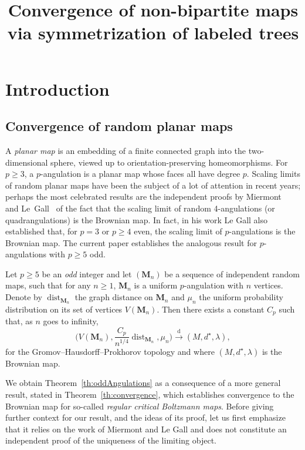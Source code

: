 \documentclass[AHL,Unicode,longabstracts,published]{cedram}
\title[Convergence of non-bipartite maps]{Convergence of non-bipartite maps via symmetrization of labeled trees}
\author[\initial{L.} \lastname{Addario-Berry}]{\firstname{Louigi} \lastname{Addario-Berry}}
\author[\initial{M.} \lastname{Albenque}]{\firstname{Marie} \lastname{Albenque}}
\newcommand{\bM}{\mathbf{M}}
\DeclareMathOperator{\dist}{dist}
\newcommand{\convdist}{\ensuremath{\stackrel{\mathrm{d}}{\rightarrow}}}
\begin{document}
\maketitle


\section{Introduction}\label{sec:introduction}

\subsection{Convergence of random planar maps}
A \emph{planar map} is an embedding of a finite connected graph into the two-dimensional sphere, viewed up to orientation-preserving homeomorphisms. For $p\geq 3$, a \linebreak$p$-angulation is a planar map whose faces all have degree $p$. Scaling limits of random planar maps have been the subject of a lot of attention in recent years; perhaps the most celebrated results are the independent proofs by Miermont~\cite{MiermontBrownian} and Le~Gall~\cite{LeGallUniqueness} of the fact that the scaling limit of random 4-angulations (or quadrangulations) is the Brownian map. In fact, in his work Le Gall also established that, for $p=3$ or $p\ge 4$ even, the scaling limit of $p$-angulations is the Brownian map. The current paper establishes the analogous result for $p$-angulations with $p\ge 5$ odd.

\begin{theo}\label{th:oddAngulations}
Let $p\geq 5$ be an \emph{odd} integer and let $(\bM_n)$ be a sequence of independent random maps, such that for any $n\geq 1$, $\bM_n$ is a uniform $p$-angulation with $n$ vertices. Denote by $\dist_{\bM_n}$ the graph distance on $\bM_n$ and $\mu_n$ the uniform probability distribution on its set of vertices $V(\bM_n)$. Then there exists a constant $C_p$ such that, as $n$ goes to infinity,
\[
\Big(V(\bM_n),\frac{C_p}{n^{1/4}}\dist_{\bM_n},\mu_n\Big) \convdist (M,d^\star,\lambda),
\]
for the Gromov--Hausdorff--Prokhorov topology and where $(M,d^\star,\lambda)$ is the Brownian map.
\end{theo}

We obtain Theorem~\ref{th:oddAngulations} as a consequence of a more general result, stated in Theorem~\ref{th:convergence}, which establishes convergence to the Brownian map for so-called \emph{regular critical Boltzmann maps}. Before giving further context for our result, and the ideas of its proof, let us first emphasize that it relies on the work of Miermont and Le Gall and does not constitute an independent proof of the uniqueness of the limiting object.
\end{document}
